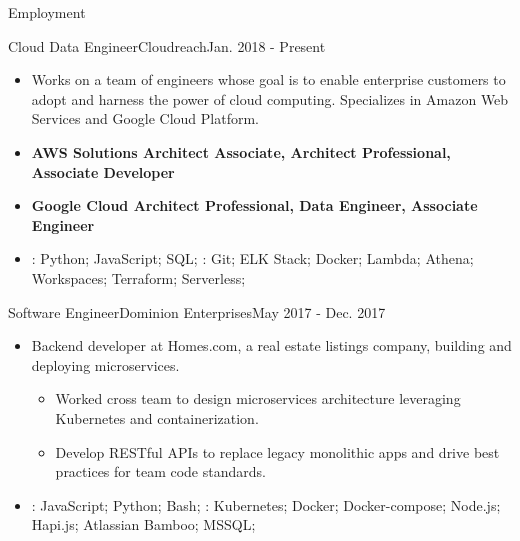 \documentclass[]{mcdowellcv}
\begin{document}
    \makeheader

    \begin{cvsection}{Employment}


        \begin{cvsubsection}{Cloud Data Engineer}{Cloudreach}{Jan. 2018 - Present}
            \begin{itemize}
                \item Works on a team of engineers whose goal is to enable enterprise customers to adopt and harness the power of cloud computing. 
                Specializes in Amazon Web Services and Google Cloud Platform.
                \item \textbf{AWS Solutions Architect Associate, Architect Professional, Associate Developer} 
                \item \textbf{Google Cloud Architect Professional, Data Engineer, Associate Engineer} 
            \end{itemize}
            \begin{itemize}
                 \item {}: Python; JavaScript; SQL; \newline
                : Git; ELK Stack; Docker; Lambda; Athena; Workspaces; Terraform; Serverless;
            \end{itemize}
        \end{cvsubsection}

        \begin{cvsubsection}{Software Engineer}{Dominion Enterprises}{May 2017 - Dec. 2017}
            \begin{itemize}
                \item Backend developer at Homes.com, a real estate listings company, building and deploying microservices.
                \begin{itemize}
                    \item Worked cross team to design microservices architecture leveraging Kubernetes and containerization.
                    \item Develop RESTful APIs to replace legacy monolithic apps and drive best practices for team code standards.  
                \end{itemize}
            \end{itemize}
            \begin{itemize}
                 \item {}: JavaScript; Python; Bash;  \newline
                : Kubernetes; Docker; Docker-compose; Node.js; Hapi.js; Atlassian Bamboo; MSSQL;
            \end{itemize}
        \end{cvsubsection}


\end{cvsection}
\end{document}
